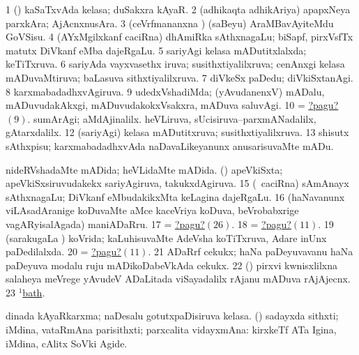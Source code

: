\noindent
\gl{\pagu}
\bmng
\bnum
\num{1}  (\AmA) kaSaTxvAda kelasa; duSakxra kAyaR. 
\num{2}  (adhikaqta adhikAriya) apapxNeya parxkAra; AjAcnxnusAra. 
\num{3}  (ceVrfmananxna \vi) (saBeyu) AraMBavAyiteMdu GoVSisu. 
\num{4}  (AYxMgilxkanf caciRna) dhAmiRka sAthxnagaLu; biSapf, pirxVsfTx matutx DiVkanf eMba dajeRgaLu. 
\num{5}  sariyAgi kelasa mADutitxlalxda; keTiTxruva. 
\num{6}  sariyAda vayxvasethx iruva; susithxtiyalilxruva; cenAnxgi kelasa mADuvaMtiruva; baLasuva sithxtiyalilxruva. 
\num{7}  diVkeSx paDedu; diVkiSxtanAgi. 
\num{8}  karxmabadadhxvAgiruva. 
\hypertarget{orderpagu9}{} 
\num{9}  udedxVshadiMda; (yAvudanenxV) mADalu, mADuvudakAkxgi, mADuvudakokxVsakxra, mADuva saluvAgi. 
\num{10}  = \hyperlink{orderpagu9}{?pagu?\((9)\)}. 
\hypertarget{order1pagu11}{} 
  
\banum
{} sumArAgi; aMdAjinalilx. 
 heVLiruva, sUcisiruva--parxmANadalilx, gAtarxdalilx. 
\eanum
\numie
\num{12}  (sariyAgi) kelasa mADutitxruva; susithxtiyalilxruva. 
\num{13}  shisutx sAthxpisu; karxmabadadhxvAda naDavaLikeyanunx anusarisuvaMte mADu. 
  
\banum
{} nideRVshadaMte mADida; heVLidaMte mADida. 
 (\rUpa) apeVkiSxta; apeVkiSxsiruvudakekx sariyAgiruva, takukxdAgiruva. 
\eanum
\numie
\num{15}  (\roVkAyx\ caciRna) sAmAnayx sAthxnagaLu; DiVkanf eMbudakikxMta keLagina dajeRgaLu. 
\num{16}  (haNavanunx viLAsadAranige koDuvaMte aMce kaceVriya koDuva, beVrobabxrige vagARyisalAgada) maniADaRru. 
\num{17}  = \hyperlink{order1pagu26}{?pagu?\((26)\)}. 
\num{18}  = \hyperlink{order1pagu11}{?pagu?\((11)\)}. 
\num{19}  (sarakugaLa \vi) koVrida; kaLuhisuvaMte AdeVsha koTiTxruva, Adare inUnx paDedilalxda. 
\num{20}  = \hyperlink{order1pagu11}{?pagu?\((11)\)}. 
\num{21}  ADaRrf cekukx; haNa paDeyuvavanu haNa paDeyuva modalu ruju mADikoDabeVkAda cekukx. 
\num{22}  (\birx) pirxvi kwnisxlilxna salaheya meVrege yAvudeV ADaLitada viSayadalilx rAjanu mADuva rAjAjecnx. 
\num{23}  \hyperref{kandict_b.pdf}{B}{bath(1) pagu}{$^1$bath}. 
  
\banum
{} dinada kAyaRkarxma; naDesalu gotutxpaDisiruva kelasa. 
 (\rUpa) sadayxda sithxti; iMdina, vataRmAna parisithxti; parxcalita vidayxmAna:  kirxkeTf ATa Igina, iMdina, cAlitx SoVki Agide. 
